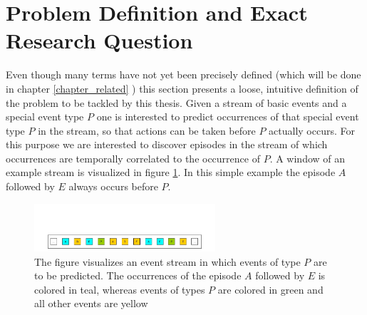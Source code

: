 
\section{Problem Definition and Exact Research Question}
Even though many terms have not yet been precisely defined (which will be done in chapter \ref{chapter_related} ) this section presents a loose, intuitive definition of the problem to be tackled by this thesis. Given a stream of basic events and a special event type $P$ one is interested to predict occurrences of that special event type $P$ in the stream, so that actions can be taken before $P$ actually occurs. For this purpose we are interested to discover episodes in the stream of which occurrences are temporally correlated to the occurrence of $P$. A window of an example stream is visualized in figure \ref{fig_predictiveEpisodeExample}. In this simple example the episode $A$ followed by $E$ always occurs before $P$.

\begin{figure}[h]
	\centering
  	\includegraphics[width=0.6\textwidth]{examplePrediction.jpg}
	\caption{The figure visualizes an event stream in which events of type $P$ are to be predicted. The occurrences of the episode $A$ followed by $E$ is colored in teal, whereas events of types $P$ are colored in green and all other events are yellow}
	\label{fig_predictiveEpisodeExample}
\end{figure}

